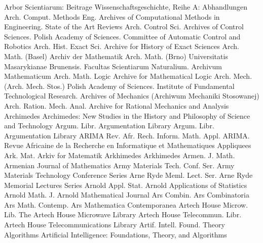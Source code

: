 {Arbor Scientiarum: Beitrage Wissenschaftsgeschichte, Reihe A: Abhandlungen}
{Arch. Comput. Methods Eng.}
{Archives of Computational Methods in Engineering. State of the Art Reviews}
{Arch. Control Sci.}
{Archives of Control Sciences. Polish Academy of Sciences. Committee of Automatic Control and Robotics}
{Arch. Hist. Exact Sci.}
{Archive for History of Exact Sciences}
{Arch. Math. (Basel)}
{Archiv der Mathematik}
{Arch. Math. (Brno)}
{Universitatis Masarykianae Brunensis. Facultas Scientiarum Naturalium. Archivum Mathematicum}
{Arch. Math. Logic}
{Archive for Mathematical Logic}
{Arch. Mech. (Arch. Mech. Stos.)}
{Polish Academy of Sciences. Institute of Fundamental Technological Research. Archives of Mechanics (Archiwum Mechaniki Stosowanej)}
{Arch. Ration. Mech. Anal.}
{Archive for Rational Mechanics and Analysis}
{Archimedes}
{Archimedes: New Studies in the History and Philosophy of Science and Technology}
{Argum. Libr.}
{Argumentation Library}
{Argum. Libr.}
{Argumentation Library}
{ARIMA Rev. Afr. Rech. Inform. Math. Appl.}
{ARIMA. Revue Africaine de la Recherche en Informatique et Mathematiques Appliquees}
{Ark. Mat.}
{Arkiv for Matematik}
{Arkhimedes}
{Arkhimedes}
{Armen. J. Math.}
{Armenian Journal of Mathematics}
{Army Materials Tech. Conf. Ser.}
{Army Materials Technology Conference Series}
{Arne Ryde Meml. Lect. Ser.}
{Arne Ryde Memorial Lectures Series}
{Arnold Appl. Stat.}
{Arnold Applications of Statistics}
{Arnold Math. J.}
{Arnold Mathematical Journal}
{Ars Combin.}
{Ars Combinatoria}
{Ars Math. Contemp.}
{Ars Mathematica Contemporanea}
{Artech House Microw. Lib.}
{The Artech House Microwave Library}
{Artech House Telecommun. Libr.}
{Artech House Telecommunications Library}
{Artif. Intell. Found. Theory Algorithms}
{Artificial Intelligence: Foundations, Theory, and Algorithms}
